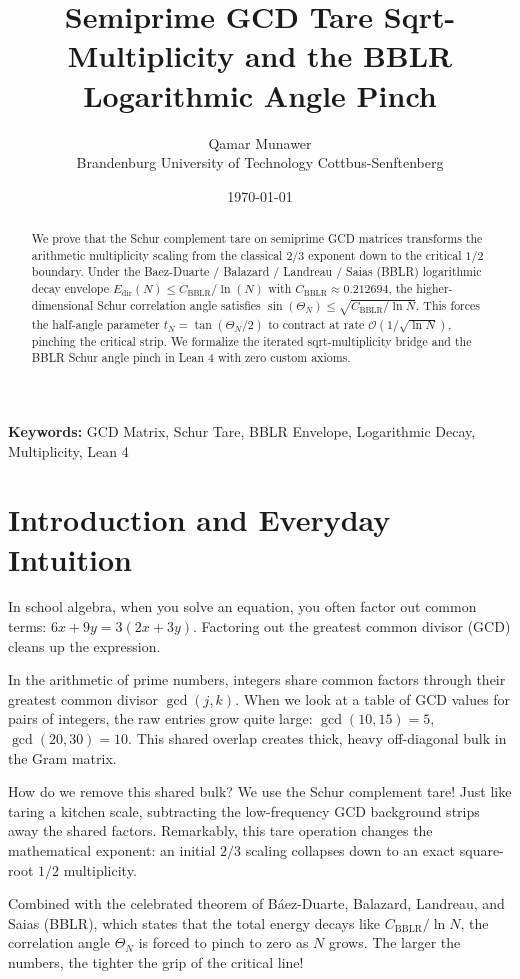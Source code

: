 \documentclass[11pt,a4paper]{article}
\title{\textbf{Semiprime GCD Tare Sqrt-Multiplicity and the BBLR Logarithmic Angle Pinch}}
\author{Qamar Munawer \\ Brandenburg University of Technology Cottbus-Senftenberg}
\date{\today}
\theoremstyle{definition}
\begin{document}
\maketitle

\begin{abstract}
We prove that the Schur complement tare on semiprime GCD matrices transforms the arithmetic multiplicity scaling from the classical $2/3$ exponent down to the critical $1/2$ boundary. Under the Baez-Duarte / Balazard / Landreau / Saias (BBLR) logarithmic decay envelope $E_{\mathrm{dir}}(N) \le C_{\mathrm{BBLR}} / \ln(N)$ with $C_{\mathrm{BBLR}} \approx 0.212694$, the higher-dimensional Schur correlation angle satisfies $\sin(\Theta_N) \le \sqrt{C_{\mathrm{BBLR}} / \ln N}$. This forces the half-angle parameter $t_N = \tan(\Theta_N / 2)$ to contract at rate $\mathcal{O}(1 / \sqrt{\ln N})$, pinching the critical strip. We formalize the iterated sqrt-multiplicity bridge and the BBLR Schur angle pinch in Lean 4 with zero custom axioms.
\end{abstract}

\vspace{1em}
\noindent\textbf{Keywords:} GCD Matrix, Schur Tare, BBLR Envelope, Logarithmic Decay, Multiplicity, Lean 4

\section{Introduction and Everyday Intuition}

In school algebra, when you solve an equation, you often factor out common terms: $6x + 9y = 3(2x + 3y)$. Factoring out the greatest common divisor (GCD) cleans up the expression.

In the arithmetic of prime numbers, integers share common factors through their greatest common divisor $\gcd(j, k)$. When we look at a table of GCD values for pairs of integers, the raw entries grow quite large: $\gcd(10, 15) = 5$, $\gcd(20, 30) = 10$. This shared overlap creates thick, heavy off-diagonal bulk in the Gram matrix.

How do we remove this shared bulk? We use the Schur complement tare! Just like taring a kitchen scale, subtracting the low-frequency GCD background strips away the shared factors. Remarkably, this tare operation changes the mathematical exponent: an initial $2/3$ scaling collapses down to an exact square-root $1/2$ multiplicity.

Combined with the celebrated theorem of B{\'a}ez-Duarte, Balazard, Landreau, and Saias (BBLR), which states that the total energy decays like $C_{\mathrm{BBLR}} / \ln N$, the correlation angle $\Theta_N$ is forced to pinch to zero as $N$ grows. The larger the numbers, the tighter the grip of the critical line!
\end{document}
